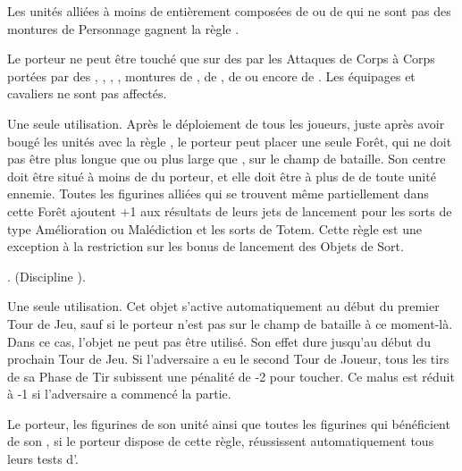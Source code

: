 \endpricelist

\armytalismans

\startpricelist

Les unités alliées à moins de  entièrement composées de \razortusks{} ou de \chariots{} qui ne sont pas des montures de Personnage gagnent la règle \vanguard{}.

Le porteur ne peut être touché que sur des  par les Attaques de Corps à Corps portées par des \swarms{}, \warbeasts{}, \monstrousbeasts{}, \monsters{}, montures de \cavalry{}, de \monstrouscavalry{}, de \riddenmonsters{} ou encore de \chariots{}. Les équipages et cavaliers ne sont pas affectés.

\endpricelist

\armyenchanteditems

\startpricelist

Une seule utilisation. Après le déploiement de tous les joueurs, juste après avoir bougé les unités avec la règle \vanguard{}, le porteur peut placer une seule Forêt, qui ne doit pas être plus longue que  ou plus large que , sur le champ de bataille. Son centre doit être situé à moins de  du porteur, et elle doit être à plus de  de toute unité ennemie. Toutes les figurines alliées qui se trouvent même partiellement dans cette Forêt ajoutent +1 aux résultats de leurs jets de lancement pour les sorts de type Amélioration ou Malédiction et les sorts de Totem. Cette règle est une exception à la restriction sur les bonus de lancement des Objets de Sort.

. \wildernessone{} (Discipline \wilderness{}).

Une seule utilisation. Cet objet s'active automatiquement au début du premier Tour de Jeu, sauf si le porteur n'est pas sur le champ de bataille à ce moment-là. Dans ce cas, l'objet ne peut pas être utilisé. Son effet dure jusqu'au début du prochain Tour de Jeu. Si l'adversaire a eu le second Tour de Joueur, tous les tirs de sa Phase de Tir subissent une pénalité de -2 pour toucher. Ce malus est réduit à -1 si l'adversaire a commencé la partie.

Le porteur, les figurines de son unité ainsi que toutes les figurines qui bénéficient de son \inspiringpresence{}, si le porteur dispose de cette règle, réussissent automatiquement tous leurs tests d'\primalinstinct{}.

